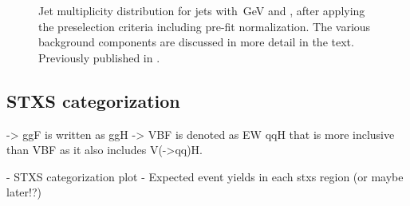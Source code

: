 \begin{figure}
    \caption{Jet multiplicity distribution for jets with \,GeV and , after applying the preselection criteria including pre-fit normalization. The various background components are discussed in more detail in the text. Previously published in .}
    \label{fig:njet-dist}
\end{figure}


\subsection{STXS categorization}
\label{subsec:STXS-categorization}

-> ggF is written as ggH
-> VBF is denoted as EW qqH that is more inclusive than VBF as it also includes V(->qq)H.

- STXS categorization plot
- Expected event yields in each stxs region (or maybe later!?)




